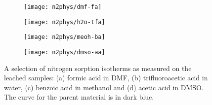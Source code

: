 \begin{figure}[htbp]
    \centering

    \begin{subfigure}{0.45\linewidth}
        \texttt{[image: n2phys/dmf-fa]}%
		\caption{}%
        \label{def:fgr:n2phys-dmf-fa}
    \end{subfigure}
    \begin{subfigure}{0.45\linewidth}
        \texttt{[image: n2phys/h2o-tfa]}%
		\caption{}%
        \label{def:fgr:n2phys-h2o-tfa}
    \end{subfigure}

    
    \begin{subfigure}{0.45\linewidth}
        \texttt{[image: n2phys/meoh-ba]}%
		\caption{}%
        \label{def:fgr:n2phys-meoh-ba}
    \end{subfigure}
    \begin{subfigure}{0.45\linewidth}
        \texttt{[image: n2phys/dmso-aa]}%
		\caption{}%
        \label{def:fgr:n2phys-dmso-aa}
    \end{subfigure}

    \caption{A selection of nitrogen sorption isotherms as measured on the
    leached samples: (a) formic acid in DMF, (b) trifluoroacetic
    acid in water, (c) benzoic acid in methanol and (d) acetic acid
    in DMSO. The curve for the parent material is in dark blue.}%
    \label{def:fgr:n2phys-dataset}
\end{figure}
